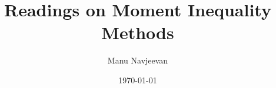 \documentclass[10pt]{article}
\title{Readings on Moment Inequality Methods}
\author{Manu Navjeevan}
\date{\today}
\theoremstyle{exampstyle}
\begin{document}
\maketitle
\tableofcontents
\newpage
\normalsize





\newpage

\newpage

\end{document}
